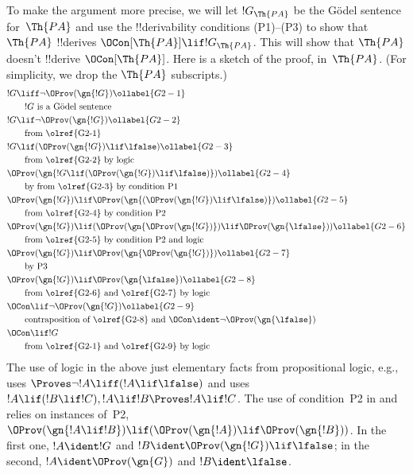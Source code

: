 \documentclass[../../../include/open-logic-section]{subfiles}
\begin{document}
To make the argument more precise, we will let $!G_\Th{PA}$ be the
G\"odel sentence for~$\Th{PA}$ and use the !!{derivability} conditions
(P1)--(P3) to show that $\Th{PA}$ !!{derive}s $\OCon[\Th{PA}] \lif
!G_\Th{PA}$. This will show that $\Th{PA}$ doesn't !!{derive}
$\OCon[\Th{PA}]$. Here is a sketch of the proof, in~$\Th{PA}$. (For
simplicity, we drop the $\Th{PA}$ subscripts.)
\begin{align}
& !G \liff \lnot \OProv(\gn{!G}) \ollabel{G2-1}\\
& \qquad\text{$!G$ is a G\"odel sentence}\notag \\
& !G \lif \lnot \OProv(\gn{!G}) \ollabel{G2-2}\\
  & \qquad\text{from \olref{G2-1}} \notag\\
& !G \lif
  (\OProv(\gn{!G}) \lif \lfalse) \ollabel{G2-3}\\
  & \qquad\text{from \olref{G2-2} by logic}\notag\\
& \OProv(\gn{
    !G \lif
    (\OProv(\gn{!G}) \lif \lfalse)
  }) \ollabel{G2-4}\\
  & \qquad\text{by from \olref{G2-3} by condition P1} \notag\\
& \OProv(\gn{!G}) \lif
  \OProv(\gn{
    (\OProv(\gn{!G}) \lif \lfalse)
    }) \ollabel{G2-5}\\
  & \qquad\text{from \olref{G2-4} by condition P2} \notag\\
& \OProv(\gn{!G}) \lif (\OProv(\gn{\OProv(\gn{!G})}) \lif \OProv(\gn{\lfalse})) \ollabel{G2-6}\\
  & \qquad\text{from \olref{G2-5} by condition P2 and logic} \notag\\
& \OProv(\gn{!G}) \lif 
  \OProv(\gn{\OProv(\gn{!G})}) \ollabel{G2-7}\\
   & \qquad\text{by P3} \notag\\
& \OProv(\gn{!G}) \lif \OProv(\gn{\lfalse}) \ollabel{G2-8}\\
  & \qquad \text{from \olref{G2-6} and \olref{G2-7} by logic}\notag\\
& \OCon \lif \lnot \OProv(\gn{!G}) \ollabel{G2-9}\\
  & \qquad\text{contraposition of \olref{G2-8} and $\OCon \ident \lnot \OProv(\gn{\lfalse})$}\notag \\
& \OCon \lif !G \notag\\
  & \qquad\text{from \olref{G2-1} and \olref{G2-9} by logic}\notag
\end{align}
The use of logic in the above just elementary facts from propositional
logic, e.g.,  uses $\Proves \lnot!A \liff (!A\lif
\lfalse)$ and  uses $!A \lif (!B \lif !C), !A \lif !B
\Proves !A \lif !C$. The use of condition~P2 in  and
 relies on instances of~P2, $\OProv(\gn{!A \lif !B}) \lif
(\OProv(\gn{!A}) \lif \OProv(\gn{!B}))$. In the first one, $!A \ident
!G$ and $!B \ident \OProv(\gn{!G}) \lif \lfalse$; in the second, $!A
\ident \OProv(\gn{G})$ and $!B \ident \lfalse$.
\end{document}
